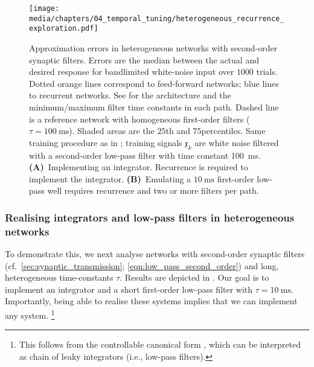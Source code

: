 \begin{figure}
	\centering
	\texttt{[image: media/chapters/04\_temporal\_tuning/heterogeneous\_recurrence\_exploration.pdf]}
	\caption[Approximation errors in heterogeneous networks with second-order synaptic filters]{Approximation errors in heterogeneous networks with second-order synaptic filters.
	Errors are the median \NRMSE between the actual and desired response for bandlimited white-noise input over $1000$ trials.
	Dotted orange lines correspond to feed-forward networks; blue lines to recurrent networks.
	See  for the architecture and the minimum/maximum filter time constants in each path.
	Dashed line is a reference network with homogeneous first-order filters ($\tau = \SI{100}{\milli\second}$).
	Shaded areas are the $25$th and $75$percentiles.
	Same training procedure as in ; training signals $\mathfrak{x}_k$ are white noise filtered with a second-order low-pass filter with time constant \SI{100}{\milli\second}.
	\textbf{(A)}~Implementing an integrator.
	Recurrence is required to implement the integrator.
	\textbf{(B)}~Emulating a $\SI{10}{\milli\second}$ first-order low-pass well requires recurrence and two or more filters per path.
	}
	\label{fig:heterogeneous_recurrence_exploration}
\end{figure}

\subsubsection{Realising integrators and low-pass filters in heterogeneous networks}
To demonstrate this, we next analyse networks with second-order synaptic filters (cf.~\cref{sec:synaptic_transmission}; \cref{eqn:low_pass_second_order}) and long, heterogeneous time-constants $\tau$.
Results are depicted in .
Our goal is to implement an integrator and a short first-order low-pass filter with $\tau = \SI{10}{\milli\second}$.
Importantly, being able to realise these systems implies that we can implement any \LTI system.%
\footnote{This follows from the controllable canonical form \citep[cf.][Section~3.4.4]{verhaegen2007filtering}, which can be interpreted as chain of leaky integrators (i.e., low-pass filters).}

